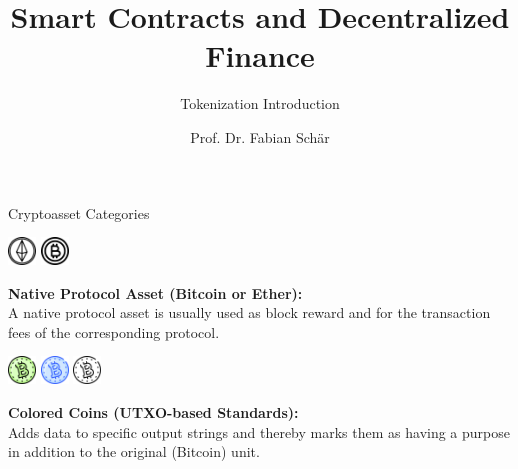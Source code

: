 \documentclass[handout]{beamer}
\title{Smart Contracts and Decentralized Finance}
\subtitle{Tokenization Introduction}
\author{Prof. Dr. Fabian Schär}
\institute{University of Basel}
\begin{document}
\thispagestyle{empty}
\begin{frame}[noframenumbering]
	\titlepage
\end{frame}

\begin{frame}{Cryptoasset Categories}
	\begin{minipage}{0.2\textwidth}
			\begin{center}
				\includegraphics[height=2em]{../assets/images/ethertoken}
				\includegraphics[height=2em]{../assets/images/bitcointoken}
			\end{center}
		\end{minipage}
		\begin{minipage}{0.7\textwidth}
			\textbf{Native Protocol Asset (Bitcoin or Ether):} \\
			A native protocol asset is usually used as block reward and for the transaction fees of the corresponding protocol.
		\end{minipage}
	
		\pause
		\vspace{1.5 em}
		\begin{minipage}{0.2\textwidth}
			\begin{center}
				\includegraphics[height=2em]{../assets/images/green_coin}
				\includegraphics[height=2em]{../assets/images/blue_coin}
				\includegraphics[height=2em]{../assets/images/grey_coin}
			\end{center}
		\end{minipage}
		\begin{minipage}{0.7\textwidth}
			\textbf{Colored Coins (UTXO-based Standards):} \\
			Adds data to specific output strings and thereby marks them as having a purpose in addition to the original (Bitcoin) unit.
		\end{minipage}
	

\end{frame}
\end{document}
